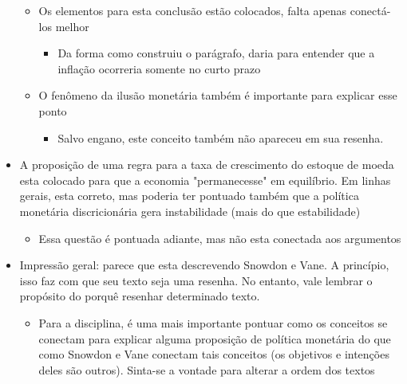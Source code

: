 \documentclass[11pt]{article}
\begin{document}
\begin{itemize}
\begin{itemize}
\item Os elementos para esta conclusão estão colocados, falta apenas conectá-los melhor
\begin{itemize}
\item Da forma como construiu o parágrafo, daria para entender que a inflação ocorreria somente no curto prazo
\end{itemize}
\item O fenômeno da ilusão monetária também é importante para explicar esse ponto
\begin{itemize}
\item Salvo engano, este conceito também não apareceu em sua resenha.
\end{itemize}
\end{itemize}
\item A proposição de uma regra para a taxa de crescimento do estoque de moeda esta colocado para que a economia "permanecesse" em equilíbrio. Em linhas gerais, esta correto, mas poderia ter pontuado também que a política monetária discricionária gera instabilidade (mais do que estabilidade)
\begin{itemize}
\item Essa questão é pontuada adiante, mas não esta conectada aos argumentos
\end{itemize}
\item Impressão geral: parece que esta descrevendo Snowdon e Vane. A princípio, isso faz com que seu texto seja uma resenha. No entanto, vale lembrar o propósito do porquê resenhar determinado texto.
\begin{itemize}
\item Para a disciplina, é uma mais importante pontuar como os conceitos se conectam para explicar alguma proposição de política monetária do que como Snowdon e Vane conectam tais conceitos (os objetivos e intenções deles são outros). Sinta-se a vontade para alterar a ordem dos textos
\end{itemize}
\end{itemize}
\end{document}
